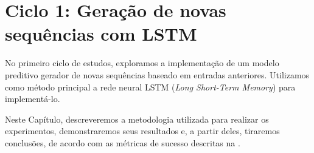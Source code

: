 \chapter{Ciclo 1: Geração de novas sequências com LSTM}
\label{chap:lstm}

No primeiro ciclo de estudos, exploramos a implementação de um modelo preditivo gerador de novas sequências baseado em entradas anteriores. Utilizamos como método principal a rede neural LSTM (\textit{Long Short-Term Memory}) para implementá-lo.

Neste Capítulo, descreveremos a metodologia utilizada para realizar os experimentos, demonstraremos seus resultados e, a partir deles, tiraremos conclusões, de acordo com as métricas de sucesso descritas na .


